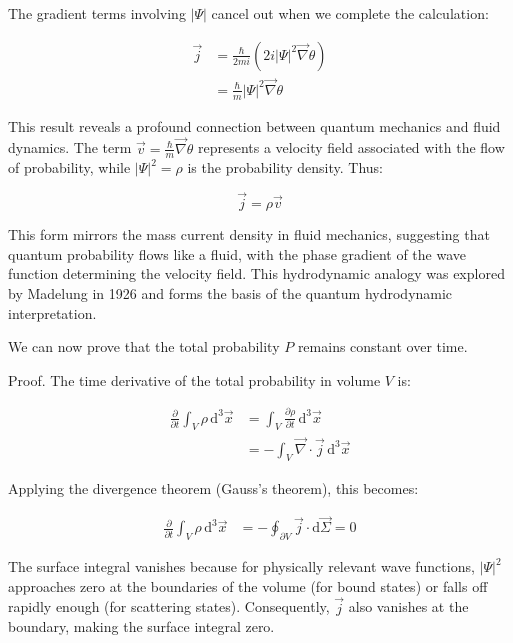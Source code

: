 \documentclass[italian]{HKNdocument}
\begin{document}
The gradient terms involving $|\Psi|$ cancel out when we complete the calculation:

\begin{align}
\vec{j} &= \frac{\hbar}{2 m i}\left(2 i|\Psi|^{2} \vec{\nabla} \theta\right) \\
&= \frac{\hbar}{m}|\Psi|^{2} \vec{\nabla} \theta
\end{align}

This result reveals a profound connection between quantum mechanics and fluid dynamics. The term $\vec{v}=\frac{\hbar}{m} \vec{\nabla} \theta$ represents a velocity field associated with the flow of probability, while $|\Psi|^2 = \rho$ is the probability density. Thus:

\begin{equation}
\vec{j}=\rho \vec{v} \label{eq:1.36}
\end{equation}

This form mirrors the mass current density in fluid mechanics, suggesting that quantum probability flows like a fluid, with the phase gradient of the wave function determining the velocity field. This hydrodynamic analogy was explored by Madelung in 1926 and forms the basis of the quantum hydrodynamic interpretation.

We can now prove that the total probability $P$ remains constant over time.

Proof. The time derivative of the total probability in volume $V$ is:

\begin{align}
\frac{\partial}{\partial t} \int_{V} \rho \, \mathrm{d}^{3} \vec{x} &= \int_{V} \frac{\partial \rho}{\partial t} \, \mathrm{d}^{3} \vec{x} \label{eq:1.37} \\
&= -\int_{V} \vec{\nabla} \cdot \vec{j} \, \mathrm{d}^{3} \vec{x}
\end{align}

Applying the divergence theorem (Gauss's theorem), this becomes:

\begin{align}
\frac{\partial}{\partial t} \int_{V} \rho \, \mathrm{d}^{3} \vec{x} &= -\oint_{\partial V} \vec{j} \cdot \mathrm{d} \vec{\Sigma} = 0
\end{align}

The surface integral vanishes because for physically relevant wave functions, $|\Psi|^2$ approaches zero at the boundaries of the volume (for bound states) or falls off rapidly enough (for scattering states). Consequently, $\vec{j}$ also vanishes at the boundary, making the surface integral zero.
\end{document}
